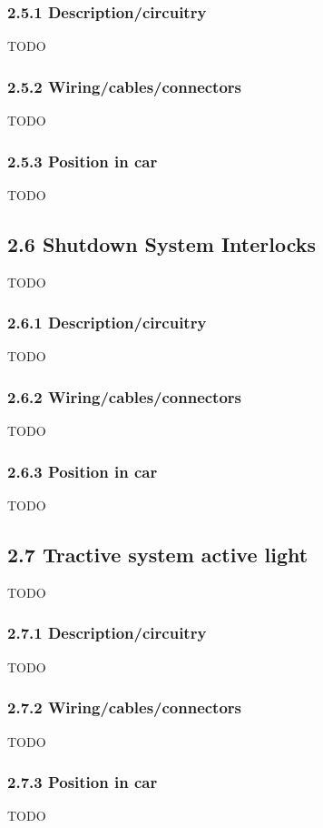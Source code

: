 \documentclass{article}
\begin{document}
\subsubsection*{2.5.1 Description/circuitry}
TODO

\subsubsection*{2.5.2 Wiring/cables/connectors}
TODO

\subsubsection*{2.5.3 Position in car}
TODO

\subsection*{2.6 Shutdown System Interlocks}
TODO

\subsubsection*{2.6.1 Description/circuitry}
TODO

\subsubsection*{2.6.2 Wiring/cables/connectors}
TODO

\subsubsection*{2.6.3 Position in car}
TODO

\subsection*{2.7 Tractive system active light}
TODO

\subsubsection*{2.7.1 Description/circuitry}
TODO

\subsubsection*{2.7.2 Wiring/cables/connectors}
TODO

\subsubsection*{2.7.3 Position in car}
TODO
\end{document}
